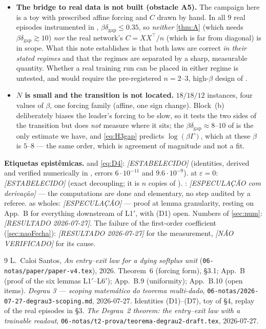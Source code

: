 \documentclass[11pt]{article}
\theoremstyle{remark}
\newcommand{\texit}{t_{\mathrm{exit}}}
\newcommand{\trel}{t_{\mathrm{release}}}
\newcommand{\dgap}{\delta_{\mathrm{gap}}}
\begin{document}
\begin{itemize}
 instances and report
$\beta(\trel-\texit)$ against both candidates.
\item[(D6)] \textbf{The bridge to real data is not built (obstacle A5).} The
campaign here is a toy with prescribed affine forcing and $C$ drawn by hand. In
all $9$ real episodes instrumented in \cite[\S3]{scoping},
$\beta\dgap\le0.35$, so \emph{neither} \cref{thm:A} (which needs
$\beta\dgap\gtrsim10$) \emph{nor} the real network's $C=XX^\top/n$ (which is far
from diagonal) is in scope. What this note establishes is that both laws are
correct \emph{in their stated regimes} and that the regimes are separated by a
sharp, measurable quantity. Whether a real training run can be placed in either
regime is untested, and would require the pre-registered $n=2$--$3$, high-$\beta$
design of \cite[\S6(ii)]{scoping}.
\item[(D7)] \textbf{$N$ is small and the transition is not located.} $18/18/12$
instances, four values of $\beta$, one forcing family (affine, one sign change).
Block~(b) deliberately biases the leader's forcing to be slow, so it tests the
two sides of the transition but does \emph{not} measure where it sits; the
$\beta\dgap\approx8$--$10$ of \cite[\S4.1]{scoping} is the only estimate we
have, and \eqref{eq:H3gap} predicts $\log(\beta\Gamma)$, which at these $\beta$
is $5$--$8$ --- the same order, which is agreement of magnitude and not a fit.
\end{itemize}

\bigskip
\noindent\textbf{Etiquetas epist\^emicas.}
 and \eqref{eq:D4}: \emph{[ESTABELECIDO]} (identities, derived and
verified numerically in \cite{scoping}, errors $6\cdot10^{-11}$ and
$9.6\cdot10^{-9}$).
 at $\varepsilon=0$: \emph{[ESTABELECIDO]} (exact decoupling; it is
$n$ copies of \cite[L1$'$]{paper}).
: \emph{[ESPECULA\c{C}\~AO com deriva\c{c}\~ao]}
--- the computations are done and elementary, no step audited by a referee.
 as wholes: \emph{[ESPECULA\c{C}\~AO]} --- proof at lemma
granularity, resting on \cite{paper} App.~B for everything downstream of L1$'$,
with (D1) open.
Numbers of \cref{sec:num}: \emph{[RESULTADO 2026-07-27]}.
The failure of the first-order coefficient (\cref{sec:naoFecha}):
\emph{[RESULTADO 2026-07-27]} for the measurement,
\emph{[N\~AO VERIFICADO]} for its cause.

\begin{thebibliography}{9}
 L.~Caloi Santos, \emph{An entry--exit law for a dying softplus
unit} (\texttt{06-notas/paper/paper-v4.tex}), 2026. Theorem~6 (forcing form),
\S3.1; App.~B (proof of the six lemmas L1$'$--L6$'$); App.~B.9 (uniformity);
App.~B.10 (open items).
 \emph{Degrau 3 --- scoping matem\'atico do teorema
multi-dado}, \texttt{06-notas/2026-07-27-degrau3-scoping.md}, 2026-07-27.
Identities (D1)--(D7), toy of \S4, replay of the real episodes in \S3.
 \emph{The Degrau~2 theorem: the entry--exit law with a
trainable readout}, \texttt{06-notas/t2-prova/teorema-degrau2-draft.tex},
2026-07-27.
\end{thebibliography}
\end{document}
